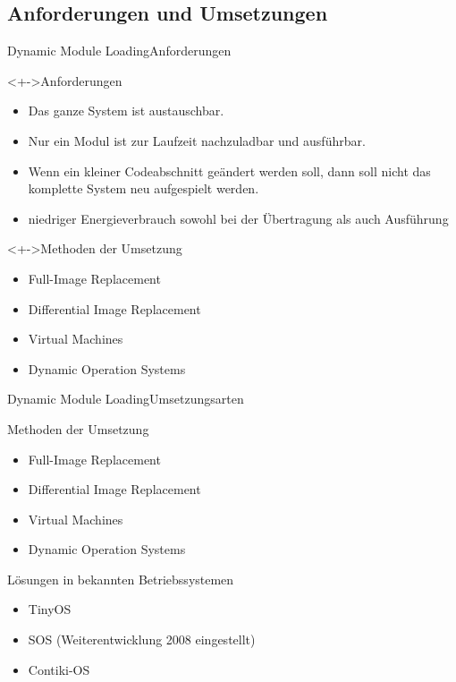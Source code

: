 \subsection{Anforderungen und Umsetzungen}
\begin{frame}{Dynamic Module Loading}{Anforderungen}
	\begin{block}<+->{Anforderungen}
		\begin{itemize}
		\item 	Das ganze System ist austauschbar.
		\item 	Nur ein Modul ist zur Laufzeit nachzuladbar und ausführbar.
		\item 	Wenn ein kleiner Codeabschnitt geändert werden soll, dann soll
				nicht das komplette System neu aufgespielt werden.
		\item 	\alert{niedriger Energieverbrauch}
				sowohl bei der Übertragung als auch Ausführung
		\end{itemize}
	\end{block}
	\begin{block}<+->{Methoden der Umsetzung} %
		\begin{itemize}
		\item 	Full-Image Replacement
		\item 	Differential Image Replacement
		\item 	Virtual Machines
		\item 	Dynamic Operation Systems
		\end{itemize}
	\end{block}
\end{frame}
\begin{frame}{Dynamic Module Loading}{Umsetzungsarten}
	\begin{block}{Methoden der Umsetzung} %
		\begin{itemize}
		\item 	Full-Image Replacement
		\item 	Differential Image Replacement
		\item 	Virtual Machines
		\item 	Dynamic Operation Systems
		\end{itemize}
	\end{block}
	\begin{block}{Lösungen in bekannten Betriebssystemen}
		\begin{itemize}
		\item 	TinyOS %
		\item 	SOS (Weiterentwicklung 2008 eingestellt) %
		\item 	Contiki-OS %
		\end{itemize}
	\end{block}
\end{frame}
